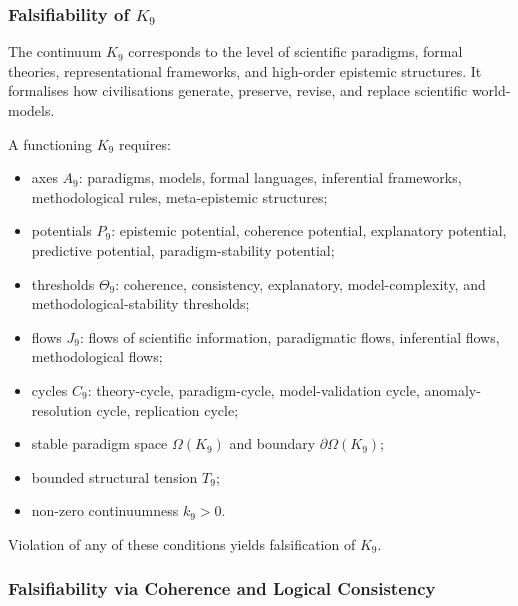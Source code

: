 
\subsubsection{Falsifiability of \texorpdfstring{$K_9$}{K_9}}
\label{sec:falsifiability-k9}

The continuum $K_9$ corresponds to the level of scientific paradigms,
formal theories, representational frameworks, and high-order epistemic
structures. It formalises how civilisations generate, preserve, revise,
and replace scientific world-models.

A functioning $K_9$ requires:

\begin{itemize}
    \item axes $A_9$: paradigms, models, formal languages,
          inferential frameworks, methodological rules,
          meta-epistemic structures;
    \item potentials $P_9$: epistemic potential, coherence potential,
          explanatory potential, predictive potential,
          paradigm-stability potential;
    \item thresholds $\Theta_9$: coherence, consistency,
          explanatory, model-complexity, and
          methodological-stability thresholds;
    \item flows $J_9$: flows of scientific information,
          paradigmatic flows, inferential flows, methodological flows;
    \item cycles $C_9$: theory-cycle, paradigm-cycle,
          model-validation cycle, anomaly-resolution cycle,
          replication cycle;
    \item stable paradigm space $\Omega(K_9)$ and boundary $\partial\Omega(K_9)$;
    \item bounded structural tension $T_9$;
    \item non-zero continuumness $k_9>0$.
\end{itemize}

Violation of any of these conditions yields falsification of $K_9$.



\subsubsection{Falsifiability via Coherence and Logical Consistency}

